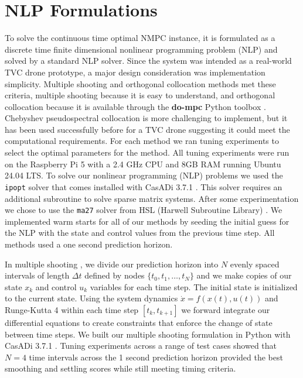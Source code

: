 \documentclass[conf]{new-aiaa}
\newcommand{\nmpc}{NMPC}
\newcommand{\dompc}{{\bf do-mpc}}
\begin{document}
\section{NLP Formulations}
	\label{nlp}
	To solve the continuous time optimal {\nmpc} instance, it is formulated as a discrete time finite dimensional nonlinear programming problem (NLP) and solved by a standard NLP solver.  
	Since the system was intended as  a real-world TVC drone prototype, a major design consideration was implementation simplicity. Multiple shooting and orthogonal collocation methods met these criteria, multiple shooting because it is easy to understand, and orthogonal collocation because it is available through  the {\dompc} Python toolbox \cite{do-mpc}. Chebyshev pseudospectral collocation is more challenging to implement, but it has been used successfully before for a TVC drone \cite{TVCDrone} suggesting it could meet the computational requirements. For each method we ran tuning experiments to select the optimal parameters for the method. All tuning experiments were run on the Raspberry Pi 5 with a 2.4 GHz CPU and 8GB RAM running Ubuntu 24.04 LTS. To solve our nonlinear programming (NLP) problems we used the \texttt{ipopt} solver \cite{ipopt} that comes installed with CasADi 3.7.1 \cite{casadi}.   This solver requires an additional subroutine to  solve sparse matrix systems. After some experimentation we chose to use the \texttt{ma27}  solver  from HSL (Harwell Subroutine Library) \cite{hsl}. 	We implemented warm starts for all of our methods by seeding the initial guess for the NLP with the state and control values from the previous time step. All methods used a one second prediction horizon.
	
	In multiple shooting \cite{multipleShootingCanon, multipleShootingpractical}, we divide our prediction horizon into $N$ evenly spaced intervals of length $\Delta t$ defined by nodes $\{ t_0, t_1, \ldots, t_N \}$ and we make copies of our state $x_k$ and control $u_k$ variables for each time step.  The initial state is initialized to the current state. 	Using the system dynamics $\dot{x} =  f(x(t),u(t))$ and Runge-Kutta 4 within each time step $[t_k, t_{k+1}]$ we forward integrate our differential equations to create constraints that enforce the change of state between time steps. 
	We built our multiple shooting formulation in Python with CasADi 3.7.1 \cite{casadi}.  Tuning experiments across a range of test cases showed that $N=4$ time intervals across the 1 second prediction horizon provided the best smoothing and settling scores while still meeting timing criteria.
	
\end{document}
